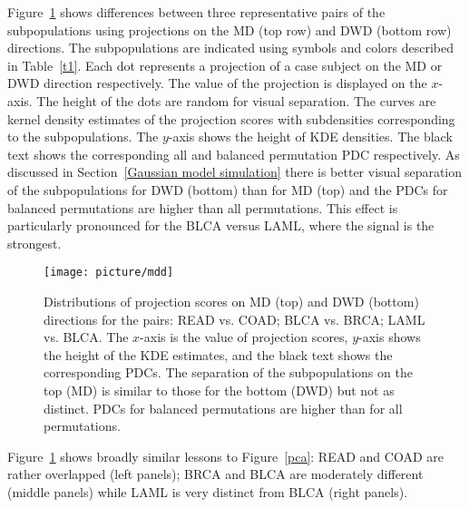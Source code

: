 \documentclass[12pt]{article}
\begin{document}
Figure~\ref{dwd} shows differences between three representative pairs of the subpopulations using projections on the MD (top row) and DWD (bottom row) directions. The subpopulations are indicated using symbols and colors described in Table~\ref{t1}. Each dot represents a projection of a case subject on the MD or DWD direction respectively. The value of the projection is displayed on the $x$-axis. The height of the dots are random for visual separation.  The curves are kernel density estimates of the projection scores with subdensities corresponding to the subpopulations. 
The $y$-axis shows the height of KDE densities. The black text shows the corresponding all and balanced permutation PDC respectively. As discussed in Section~\ref{Gaussian model simulation} there is better visual separation of the subpopulations for DWD (bottom) than for MD (top) and the PDCs for balanced permutations are higher than all permutations. This effect is particularly pronounced for the BLCA versus LAML, where the signal is the strongest. %
\begin{figure}%
  \centering
  \texttt{[image: picture/mdd]}\\
  \caption{Distributions of projection scores on MD (top) and DWD (bottom) directions for the pairs: READ vs. COAD; BLCA vs. BRCA; LAML vs. BLCA. The $x$-axis is the value of projection scores, $y$-axis shows the height of the KDE estimates, and  
  the black text shows the corresponding PDCs. The separation of the subpopulations on the top (MD) is similar to those for the bottom (DWD) but not as distinct. PDCs for balanced permutations are higher than for all permutations.}
  \label{dwd}
\end{figure}
 Figure~\ref{dwd} shows broadly similar lessons to Figure~\ref{pca}: READ and COAD are rather overlapped (left panels); BRCA and BLCA are moderately different (middle panels) while LAML is very distinct from BLCA (right panels).
\end{document}
